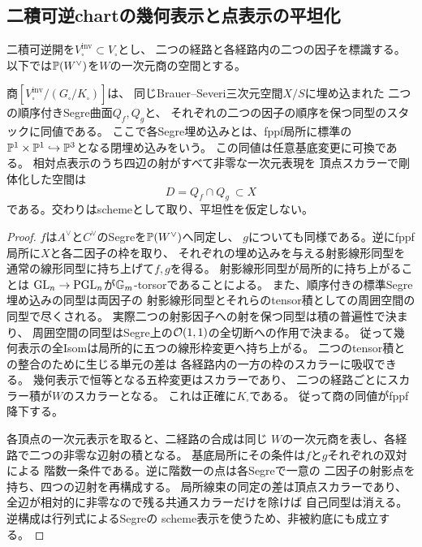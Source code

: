 \subsection{二積可逆chartの幾何表示と点表示の平坦化}
\label{subsec:qa-paired-segre-avatar}

二積可逆開を$V_\square^{\mathrm{inv}}\subset V_\square$とし、
二つの経路と各経路内の二つの因子を標識する。
以下では$\mathbb P(W^\vee)$を$W$の一次元商の空間とする。

\begin{proposition}[二つの標識付きSegre曲面による相対表示]
\label{prop:qa-paired-segre-avatar}
商$[V_\square^{\mathrm{inv}}/(G_\square/K_\square)]$は、
同じBrauer--Severi三次元空間$X/S$に埋め込まれた
二つの順序付きSegre曲面$Q_f,Q_g$と、
それぞれの二つの因子の順序を保つ同型のスタックに同値である。
ここで各Segre埋め込みとは、fppf局所に標準の
$\mathbb P^1\times\mathbb P^1\hookrightarrow\mathbb P^3$となる閉埋め込みをいう。
この同値は任意基底変更に可換である。
相対点表示のうち四辺の射がすべて非零な一次元表現を
頂点スカラーで剛体化した空間は
\[
 D=Q_f\cap Q_g\ \subset X
\]
である。交わりはschemeとして取り、平坦性を仮定しない。
\end{proposition}
\begin{proof}
$f$は$A^\vee$と$C^\vee$のSegreを$\mathbb P(W^\vee)$へ同定し、
$g$についても同様である。逆にfppf局所に$X$と各二因子の枠を取り、
それぞれの埋め込みを与える射影線形同型を
通常の線形同型に持ち上げて$f,g$を得る。
射影線形同型が局所的に持ち上がることは
$\operatorname{GL}_n\to\operatorname{PGL}_n$が$\mathbb G_m$-torsorであることによる。
また、順序付きの標準Segre埋め込みの同型は両因子の
射影線形同型とそれらのtensor積としての周囲空間の同型で尽くされる。
実際二つの射影因子への射を保つ同型は積の普遍性で決まり、
周囲空間の同型はSegre上の$\mathcal O(1,1)$の全切断への作用で決まる。
従って幾何表示の全Isomは局所的に五つの線形枠変更へ持ち上がる。
二つのtensor積との整合のために生じる単元の差は
各経路内の一方の枠のスカラーに吸収できる。
幾何表示で恒等となる五枠変更はスカラーであり、
二つの経路ごとにスカラー積が$W$のスカラーとなる。
これは正確に$K_\square$である。
従って商の同値がfppf降下する。

各頂点の一次元表示を取ると、二経路の合成は同じ
$W$の一次元商を表し、各経路で二つの非零な辺射の積となる。
基底局所にその条件は$f$と$g$それぞれの双対による
階数一条件である。逆に階数一の点は各Segreで一意の
二因子の射影点を持ち、四つの辺射を再構成する。
局所線束の同定の差は頂点スカラーであり、
全辺が相対的に非零なので残る共通スカラーだけを除けば
自己同型は消える。逆構成は行列式によるSegreの
scheme表示を使うため、非被約底にも成立する。
\end{proof}

